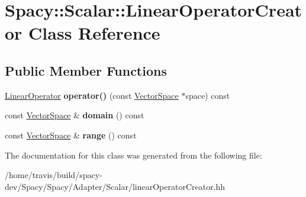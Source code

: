 \hypertarget{classSpacy_1_1Scalar_1_1LinearOperatorCreator}{\section{\-Spacy\-:\-:\-Scalar\-:\-:\-Linear\-Operator\-Creator \-Class \-Reference}
\label{classSpacy_1_1Scalar_1_1LinearOperatorCreator}
}
\subsection*{\-Public \-Member \-Functions}
\begin{DoxyCompactItemize}
\item 
\hypertarget{classSpacy_1_1Scalar_1_1LinearOperatorCreator_ac6dfc55efe19059448b54dd67ab8c9ce}{\hyperlink{structSpacy_1_1Scalar_1_1LinearOperator}{\-Linear\-Operator} {\bfseries operator()} (const \hyperlink{classSpacy_1_1VectorSpace}{\-Vector\-Space} $\ast$space) const }\label{classSpacy_1_1Scalar_1_1LinearOperatorCreator_ac6dfc55efe19059448b54dd67ab8c9ce}

\item 
\hypertarget{classSpacy_1_1Scalar_1_1LinearOperatorCreator_a4485d5a4718ec8211eae5c74090b1331}{const \hyperlink{classSpacy_1_1VectorSpace}{\-Vector\-Space} \& {\bfseries domain} () const }\label{classSpacy_1_1Scalar_1_1LinearOperatorCreator_a4485d5a4718ec8211eae5c74090b1331}

\item 
\hypertarget{classSpacy_1_1Scalar_1_1LinearOperatorCreator_adcd36576ce3d569e0e4709f8433cc372}{const \hyperlink{classSpacy_1_1VectorSpace}{\-Vector\-Space} \& {\bfseries range} () const }\label{classSpacy_1_1Scalar_1_1LinearOperatorCreator_adcd36576ce3d569e0e4709f8433cc372}

\end{DoxyCompactItemize}


\-The documentation for this class was generated from the following file\-:\begin{DoxyCompactItemize}
\item 
/home/travis/build/spacy-\/dev/\-Spacy/\-Spacy/\-Adapter/\-Scalar/linear\-Operator\-Creator.\-hh\end{DoxyCompactItemize}
